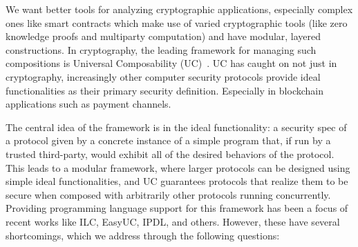 We want better tools for analyzing cryptographic applications, especially complex ones like smart contracts which make use of varied cryptographic tools (like zero knowledge proofs and multiparty computation) and have modular, layered constructions.
In cryptography, the leading framework for managing such compositions is Universal Composability (UC)~\cite{uc}.
UC has caught on not just in cryptography, increasingly other computer security protocols provide ideal functionalities as their primary security definition.
Especially in blockchain applications such as payment channels.

The central idea of the framework is in the ideal functionality: a security spec of a protocol given by a concrete instance of a simple program that, if run by a trusted third-party, would exhibit all of the desired behaviors of the protocol.
This leads to a modular framework, where larger protocols can be designed using simple ideal functionalities, and UC guarantees protocols that realize them to be secure when composed with arbitrarily other protocols running concurrently.
Providing programming language support for this framework has been a focus of recent works like ILC, EasyUC, IPDL, and others. However, these have several shortcomings, which we address through the following questions:

